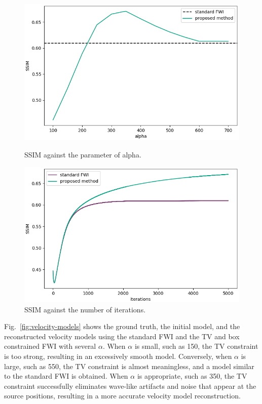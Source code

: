\begin{figure}[htbp]
    \centering
    \begin{minipage}{80mm}
        \centering
        \includegraphics[width=\linewidth]{public/alpha-ssim}
        \caption{SSIM against the parameter of alpha.}
        \label{fig:alpha-ssim}
    \end{minipage}
    \hspace{10mm}
    \begin{minipage}{80mm}
        \centering
        \includegraphics[width=\linewidth]{public/iters-ssim}
        \caption{SSIM against the number of iterations.}
        \label{fig:iters-ssim}
    \end{minipage}
\end{figure}

Fig.~\ref{fig:velocity-models} shows the ground truth, the initial model, and the reconstructed velocity models using the standard FWI and the TV and box constrained FWI with several $\alpha$.
When $\alpha$ is small, such as 150, the TV constraint is too strong, resulting in an excessively smooth model.
Conversely, when $\alpha$ is large, such as 550, the TV constraint is almost meaningless, and a model similar to the standard FWI is obtained.
When $\alpha$ is appropriate, such as 350, the TV constraint successfully eliminates wave-like artifacts and noise that appear at the source positions, resulting in a more accurate velocity model reconstruction.

